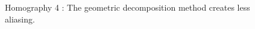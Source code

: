 
\begin{figure}
\caption{Homography 4 : The geometric decomposition method creates less aliasing.}
\label{Homo4}
\end{figure}

